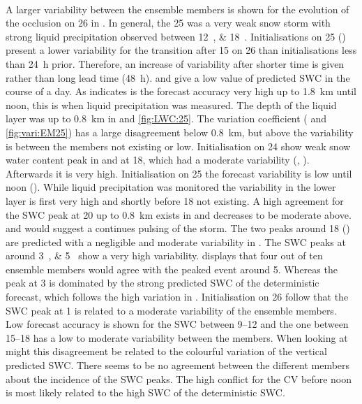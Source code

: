 \\
A larger variability between the ensemble members is shown for the evolution of the occlusion on \SI{26}{\dec} in . In general, the \SI{25}{\dec} was a very weak snow storm with strong liquid precipitation observed between \SIlist{12;18}{\UTC}. Initialisations on \SI{25}{\dec} () present a lower variability for the transition after \SI{15}{\UTC} on \SI{26}{\dec} than initialisations less than \SI{24}{\hour} prior. Therefore, an increase of variability after shorter time is given rather than long lead time (\SI{48}{\hour}).  and  give a low value of predicted SWC in the course of a day. As  indicates is the forecast accuracy very high up to \SI{1.8}{\km} until noon, this is when liquid precipitation was measured. The depth of the liquid layer was up to \SI{0.8}{\km} in  and \ref{fig:LWC:25}. The variation coefficient ( and \ref{fig:vari:EM25}) has a large disagreement below \SI{0.8}{\km}, but above the variability is between the members not existing or low. Initialisation on \SI{24}{\dec} show weak snow water content peak in  and  at \SI{18}{\UTC}, which had a moderate variability (, ). Afterwards it is very high. Initialisation on \SI{25}{\dec} the forecast variability is low until noon (). While liquid precipitation was monitored the variability in the lower layer is first very high and shortly before \SI{18}{\UTC} not existing. A high agreement for the SWC peak at \SI{20}{\UTC} up to \SI{0.8}{\km} exists in  and decreases to be moderate above. 
\\
 and  would suggest a continues pulsing of the storm. The two peaks around \SI{18}{\UTC} () are predicted with a negligible and moderate variability in . The SWC peaks at around \SIlist{3;5}{\UTC} show a very high variability.  displays that four out of ten ensemble members would agree with the peaked event around \SI{5}{\UTC}. Whereas the peak at \SI{3}{\UTC} is dominated by the strong predicted SWC of the deterministic forecast, which follows the high variation in . 
Initialisation on \SI{26}{\dec} follow that the SWC peak at \SI{1}{\UTC} is related to a moderate variability of the ensemble members. Low forecast accuracy is shown for the SWC between \SIrange{9}{12}{\UTC} and the one between \SIrange{15}{18}{\UTC} has a low to moderate variability between the members.  When looking at  might this disagreement be related to the colourful variation of the vertical predicted SWC. There seems to be no agreement between the different members about the incidence of the SWC peaks. The high conflict for the CV before noon is most likely related to the high SWC of the deterministic SWC.
